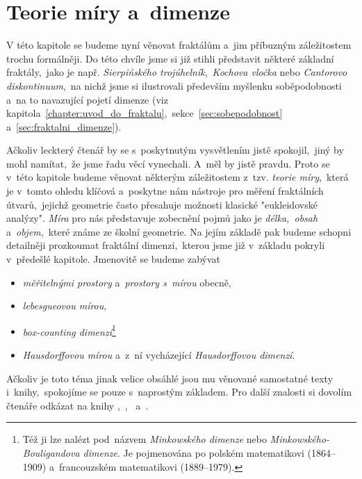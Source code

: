 \chapter{Teorie míry a~dimenze}\label{chapter:teorie-miry-a-dimenze}

V této kapitole se budeme nyní věnovat fraktálům a~jim příbuzným záležitostem trochu formálněji. Do této chvíle jsme si již stihli představit některé základní fraktály,~jako je např. \emph{Sierpińského trojúhelník},~\emph{Kochova vločka} nebo \emph{Cantorovo diskontinuum},~na nichž jsme si ilustrovali především myšlenku soběpodobnosti a~na to navazující pojetí dimenze (viz kapitola~\ref{chapter:uvod_do_fraktalu},~sekce~\ref{sec:sobepodobnost} a~\ref{sec:fraktalni_dimenze}).

Ačkoliv leckterý čtenář by se s~poskytnutým vysvětlením jistě spokojil,~jiný by mohl namítat,~že jsme řadu věcí vynechali. A~měl by jistě pravdu. Proto se v~této kapitole budeme věnovat některým záležitostem z~tzv. \emph{teorie míry},~která je v~tomto ohledu klíčová a~poskytne nám nástroje pro měření fraktálních útvarů,~jejichž geometrie často přesahuje možnosti klasické "eukleidovské analýzy". \emph{Míra} pro nás představuje zobecnění pojmů jako je \emph{délka,~obsah} a~\emph{objem},~které známe ze školní geometrie. Na jejím základě pak budeme schopni detailněji prozkoumat fraktální dimenzi,~kterou jsme již v~základu pokryli v~předešlé kapitole. Jmenovitě se budeme zabývat
\begin{itemize}
    \item \emph{měřitelnými prostory} a~\emph{prostory s~mírou} obecně,
    \item \emph{lebesgueovou mírou},
    \item \emph{box-counting dimenzí}\footnote{Též ji lze nalézt pod~názvem \emph{Minkowského dimenze} nebo \emph{Minkowského-Bouligandova dimenze}. Je pojmenována po polském matematikovi  (1864--1909) a~francouzském matematikovi  (1889--1979).}
    \item \emph{Hausdorffovou mírou} a~z~ní vycházející \emph{Hausdorffovou dimenzí}.
\end{itemize}

Ačkoliv je toto téma jinak velice obsáhlé jsou mu věnované samostatné texty i~knihy,~spokojíme se pouze s~naprostým základem. Pro další znalosti si dovolím čtenáře odkázat na knihy \cite{Falconer2014},~\cite{Lukes2013},~\cite{NetukaIntegral2016} a~\cite{Edgar2008}.

